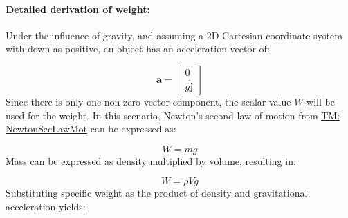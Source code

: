 \documentclass[12pt]{article}
\begin{document}
\paragraph{Detailed derivation of weight:}
\label{GD:weightDeriv}
Under the influence of gravity, and assuming a 2D Cartesian coordinate system with down as positive, an object has an acceleration vector of:

\begin{displaymath}
\mathbf{a}=\begin{bmatrix}
           0\\
           g \mathbf{\hat{j}}
           \end{bmatrix}
\end{displaymath}
Since there is only one non-zero vector component, the scalar value $W$ will be used for the weight. In this scenario, Newton's second law of motion from \hyperref[TM:NewtonSecLawMot]{TM: NewtonSecLawMot} can be expressed as:

\begin{displaymath}
W=m g
\end{displaymath}
Mass can be expressed as density multiplied by volume, resulting in:

\begin{displaymath}
W=ρ V g
\end{displaymath}
Substituting specific weight as the product of density and gravitational acceleration yields:
\end{document}

